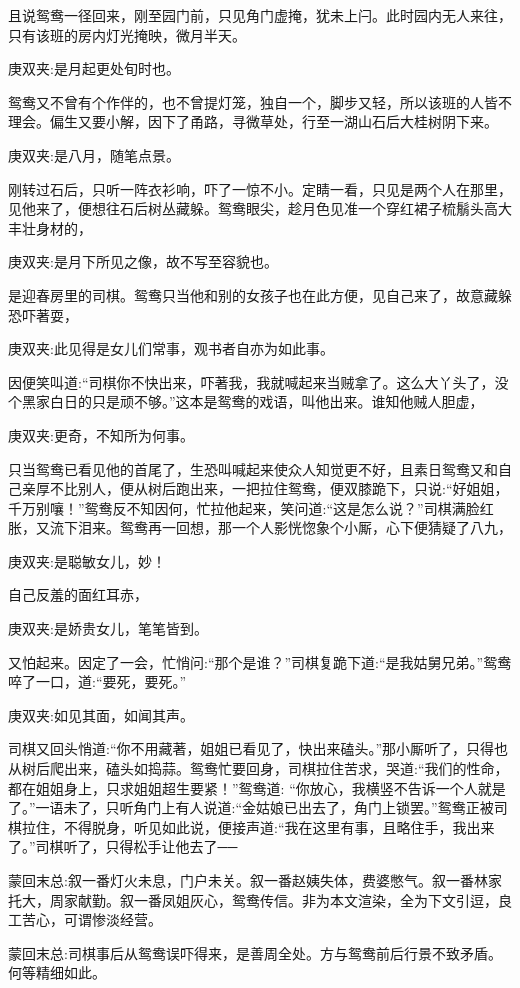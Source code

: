 \begin{parag}
    且说鸳鸯一径回来，刚至园门前，只见角门虚掩，犹未上闩。此时园内无人来往，只有该班的房内灯光掩映，微月半天。\begin{note}庚双夹:是月起更处旬时也。\end{note}鸳鸯又不曾有个作伴的，也不曾提灯笼，独自一个，脚步又轻，所以该班的人皆不理会。偏生又要小解，因下了甬路，寻微草处，行至一湖山石后大桂树阴下来。\begin{note}庚双夹:是八月，随笔点景。\end{note}刚转过石后，只听一阵衣衫响，吓了一惊不小。定睛一看，只见是两个人在那里，见他来了，便想往石后树丛藏躲。鸳鸯眼尖，趁月色见准一个穿红裙子梳鬅头高大丰壮身材的，\begin{note}庚双夹:是月下所见之像，故不写至容貌也。\end{note}是迎春房里的司棋。鸳鸯只当他和别的女孩子也在此方便，见自己来了，故意藏躲恐吓著耍，\begin{note}庚双夹:此见得是女儿们常事，观书者自亦为如此事。\end{note}因便笑叫道:“司棋你不快出来，吓著我，我就喊起来当贼拿了。这么大丫头了，没个黑家白日的只是顽不够。”这本是鸳鸯的戏语，叫他出来。谁知他贼人胆虚，\begin{note}庚双夹:更奇，不知所为何事。\end{note}只当鸳鸯已看见他的首尾了，生恐叫喊起来使众人知觉更不好，且素日鸳鸯又和自己亲厚不比别人，便从树后跑出来，一把拉住鸳鸯，便双膝跪下，只说:“好姐姐，千万别嚷！”鸳鸯反不知因何，忙拉他起来，笑问道:“这是怎么说？”司棋满脸红胀，又流下泪来。鸳鸯再一回想，那一个人影恍惚象个小厮，心下便猜疑了八九，\begin{note}庚双夹:是聪敏女儿，妙！\end{note}自己反羞的面红耳赤，\begin{note}庚双夹:是娇贵女儿，笔笔皆到。\end{note}又怕起来。因定了一会，忙悄问:“那个是谁？”司棋复跪下道:“是我姑舅兄弟。”鸳鸯啐了一口，道:“要死，要死。”\begin{note}庚双夹:如见其面，如闻其声。\end{note}司棋又回头悄道:“你不用藏著，姐姐已看见了，快出来磕头。”那小厮听了，只得也从树后爬出来，磕头如捣蒜。鸳鸯忙要回身，司棋拉住苦求，哭道:“我们的性命，都在姐姐身上，只求姐姐超生要紧！”鸳鸯道: “你放心，我横竖不告诉一个人就是了。”一语未了，只听角门上有人说道:“金姑娘已出去了，角门上锁罢。”鸳鸯正被司棋拉住，不得脱身，听见如此说，便接声道:“我在这里有事，且略住手，我出来了。”司棋听了，只得松手让他去了──
\end{parag}


\begin{parag}
    \begin{note}蒙回末总:叙一番灯火未息，门户未关。叙一番赵姨失体，费婆憋气。叙一番林家托大，周家献勤。叙一番凤姐灰心，鸳鸯传信。非为本文渲染，全为下文引逗，良工苦心，可谓惨淡经营。\end{note}
\end{parag}


\begin{parag}
    \begin{note}蒙回末总:司棋事后从鸳鸯误吓得来，是善周全处。方与鸳鸯前后行景不致矛盾。何等精细如此。\end{note}
\end{parag}
